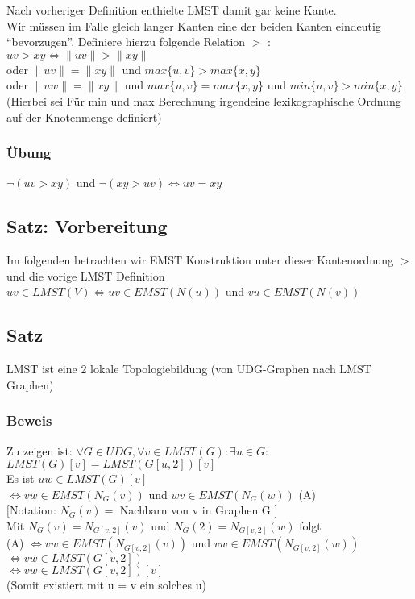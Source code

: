 \documentclass{article}
\begin{document}
\noindent Nach vorheriger Definition enthielte LMST damit gar keine Kante.\\
Wir müssen im Falle gleich langer Kanten eine der beiden Kanten eindeutig "`bevorzugen"'. Definiere hierzu folgende Relation $>$ : \\
$
uv > xy \Leftrightarrow \|uv\| > \|xy\|
$\\
\hspace*{10mm}oder 
$\|uv\| = \|xy\|$ und $max\{u, v\} > max\{x, y\}$\\
\hspace*{10mm}oder 
$\|uw\| = \|xy\|$ und $max\{u, v\} = max\{x, y\}$ und $min\{u, v\} > min\{x, y\}$
\\
(Hierbei sei Für min und max Berechnung irgendeine lexikographische Ordnung auf der Knotenmenge definiert)

\subsubsection*{Übung}
$\neg (uv > xy)$ und $\neg (xy > uv) \Leftrightarrow uv = xy$

\subsection*{Satz: Vorbereitung}
Im folgenden betrachten wir EMST Konstruktion unter dieser Kantenordnung $>$ und die vorige LMST Definition\\ 
$uv \in LMST(V) \Leftrightarrow uv \in EMST(N(u)) $
und 
$vu \in EMST(N(v))$

\subsection*{Satz}
LMST ist eine 2 lokale Topologiebildung (von UDG-Graphen nach LMST Graphen)

\subsubsection*{Beweis}
Zu zeigen ist: $\forall G \in UDG, \forall v \in LMST (G): \exists u \in G:$\\
$LMST(G)[v] = LMST(G[u, 2])[v]$\\
\vspace*{5mm}
Es ist $uw \in LMST(G)[v]$ \\
$\Leftrightarrow vw \in EMST(N_G(v))$ und $wv \in EMST(N_G(w))$ (A)\\
$[$Notation: $N_G(v) = $ Nachbarn von v in Graphen G $]$\\
Mit $N_G(v) = N_{G[v,2]}(v)$ und  $N_G(2) = N_{G[v,2]}(w)$ folgt\\
(A) $\Leftrightarrow vw \in EMST(N_{G[v,2]}(v))$ und $vw \in EMST(N_{G[v,2]}(w))$\\
$\Leftrightarrow vw \in LMST(G[v,2])$\\
$\Leftrightarrow vw \in LMST(G[v,2])[v]$ \\
(Somit existiert mit u = v ein solches u)
\end{document}

